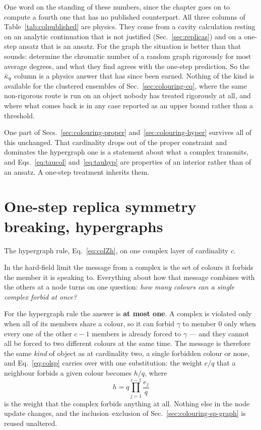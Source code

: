 One word on the standing of these numbers, since the chapter goes on to compute
a fourth one that has no published counterpart. All three columns of
Table~\ref{tab:colpublished} are physics. They come from a cavity calculation
resting on an analytic continuation that is not justified
(Sec.~\ref{sec:replicas}) and on a one-step ansatz that is an ansatz. For the
graph the situation is better than that sounds: \citet{cojaoghlan2016} determine
the chromatic number of a random graph rigorously for most average degrees, and
what they find agrees with the one-step prediction. So the $\bar\kappa_{q}$ column is
a physics answer that has since been earned. Nothing of the kind is available
for the clustered ensembles of Sec.~\ref{sec:colouring-cq}, where the same
non-rigorous route is run on an object nobody has treated rigorously at all, and
where what comes back is in any case reported as an upper bound rather than a
threshold.

One part of Secs.~\ref{sec:colouring-proper} and~\ref{sec:colouring-hyper}
survives all of this unchanged. That
cardinality drops out of the proper constraint and dominates the hypergraph one
is a statement about what a complex transmits, and Eqs.~\eqref{eq:taucol}
and~\eqref{eq:tauhyp} are properties of an interior rather than of an ansatz.
A one-step treatment inherits them.

\section{One-step replica symmetry breaking, hypergraphs}
\label{sec:colouring-sp-chy}

The hypergraph rule, Eq.~\eqref{eq:colZh}, on one complex layer of cardinality
$c$.

In the hard-field limit the
message from a complex is the set of colours it forbids the member it is
speaking to. Everything about how that message combines with the others at a
node turns on one question: \emph{how many colours can a single complex forbid
at once?}

For the hypergraph rule the answer is \textbf{at most one}. A complex is
violated only when all of its members share a colour, so it can forbid $\gamma$
to member $0$ only when every one of the other $c-1$ members is already forced
to $\gamma$ --- and they cannot all be forced to two different colours at the
same time. The message is therefore the same \emph{kind} of object as at
cardinality two, a single forbidden colour or none, and Eq.~\eqref{eq:colsp}
carries over with one substitution: the weight $e/q$ that a neighbour forbids a
given colour becomes $h/q$, where
\begin{equation}
  h=q\prod_{j=1}^{c-1}\frac{e_{j}}{q}
  \label{eq:hypsp}
\end{equation}
is the weight that the complex forbids anything at all. Nothing else in the
node update changes, and the inclusion--exclusion of
Sec.~\ref{sec:colouring-sp-graph} is reused unaltered.

